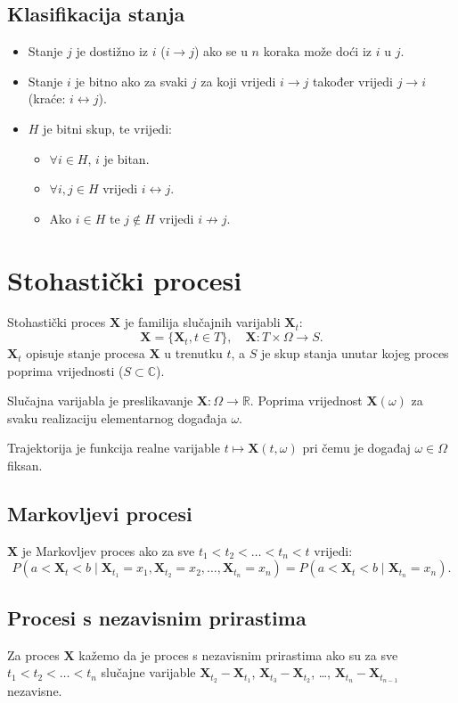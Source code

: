 \documentclass[12pt,english]{article}
\begin{document}
\subsection{Klasifikacija stanja}
\begin{itemize}
  \item Stanje $j$ je dostižno iz $i$ ($i \rightarrow j$) ako se u $n$ koraka može doći iz $i$ u $j$.
  \item Stanje $i$ je bitno ako za svaki $j$ za koji vrijedi $i \rightarrow j$ također vrijedi $j \rightarrow i$ (kraće: $i \leftrightarrow j$).
  \item $H$ je bitni skup, te vrijedi:
  \begin{itemize}
    \item $\forall i \in H$, $i$ je bitan.
    \item $\forall i,j \in H$ vrijedi $i \leftrightarrow j$.
    \item Ako $i \in H$ te $j \not\in H$ vrijedi $i \not\rightarrow j$.
  \end{itemize}
\end{itemize}

\section{Stohastički procesi}
Stohastički proces $\mathbf X$ je familija slučajnih varijabli $\mathbf X_t$:
$$\mathbf X = \{\mathbf X_t, t \in T\},\quad \mathbf X : T \times \Omega \rightarrow S.$$
$\mathbf X_t$ opisuje stanje procesa $\mathbf X$ u trenutku $t$, a $S$ je skup stanja unutar kojeg proces poprima vrijednosti ($S \subset \mathbb C$).

Slučajna varijabla je preslikavanje $\mathbf X : \Omega \rightarrow \mathbb R$. Poprima vrijednost $\mathbf X(\omega)$ za svaku realizaciju elementarnog događaja $\omega$.

Trajektorija je funkcija realne varijable $t \mapsto \mathbf X(t,\omega)$ pri čemu je događaj $\omega \in \Omega$ fiksan.

\subsection{Markovljevi procesi}
$\mathbf X$ je Markovljev proces ako za sve $t_1 < t_2 < \ldots < t_n < t$ vrijedi:
$$P(a<\mathbf X_t < b \;\vert\; \mathbf X_{t_1} = x_1, \mathbf X_{t_2} = x_2, \ldots, \mathbf X_{t_n} = x_n) = P(a < \mathbf X_t < b \;\vert\; \mathbf X_{t_n} = x_n).$$

\subsection{Procesi s nezavisnim prirastima}
Za proces $\mathbf X$ kažemo da je proces s nezavisnim prirastima ako su za sve $t_1 < t_2 < \ldots < t_n$ slučajne varijable $\mathbf X_{t_2} - \mathbf X_{t_1}$, $\mathbf X_{t_3} - \mathbf X_{t_2}$, \ldots, $\mathbf X_{t_n} - \mathbf X_{t_{n-1}}$ nezavisne.
\end{document}
